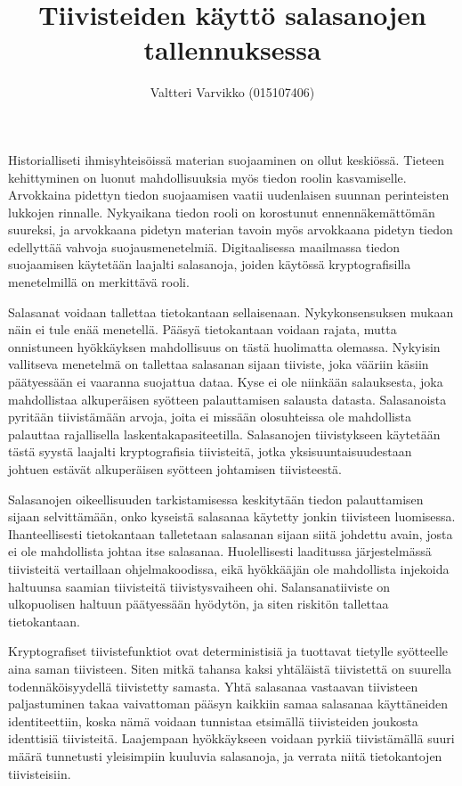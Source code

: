 \documentclass[12pt]{article}
\title{Tiivisteiden käyttö salasanojen tallennuksessa}
\author{Valtteri Varvikko (015107406)}
\begin{document}
\maketitle

Historialliseti ihmisyhteisöissä materian suojaaminen on ollut keskiössä. Tieteen kehittyminen on luonut mahdollisuuksia myös tiedon roolin kasvamiselle. Arvokkaina pidettyn tiedon suojaamisen vaatii uudenlaisen suunnan perinteisten lukkojen rinnalle. Nykyaikana tiedon rooli on korostunut ennennäkemättömän suureksi, ja arvokkaana pidetyn materian tavoin myös arvokkaana pidetyn tiedon edellyttää vahvoja suojausmenetelmiä. Digitaalisessa maailmassa tiedon suojaamisen käytetään laajalti salasanoja, joiden käytössä kryptografisilla menetelmillä on merkittävä rooli.

Salasanat voidaan tallettaa tietokantaan sellaisenaan. Nykykonsensuksen mukaan näin ei tule enää menetellä. Pääsyä tietokantaan voidaan rajata, mutta onnistuneen hyökkäyksen mahdollisuus on tästä huolimatta olemassa. Nykyisin vallitseva menetelmä on tallettaa salasanan sijaan tiiviste, joka vääriin käsiin päätyessään ei vaaranna suojattua dataa. Kyse ei ole niinkään salauksesta, joka mahdollistaa alkuperäisen syötteen palauttamisen salausta datasta. Salasanoista pyritään tiivistämään arvoja, joita ei missään olosuhteissa ole mahdollista palauttaa rajallisella laskentakapasiteetilla. Salasanojen tiivistykseen käytetään tästä syystä laajalti kryptografisia tiivisteitä, jotka yksisuuntaisuudestaan johtuen estävät alkuperäisen syötteen johtamisen tiivisteestä.

Salasanojen oikeellisuuden tarkistamisessa keskitytään tiedon palauttamisen sijaan selvittämään, onko kyseistä salasanaa käytetty jonkin tiivisteen luomisessa. Ihanteellisesti tietokantaan talletetaan salasanan sijaan siitä johdettu avain, josta ei ole mahdollista johtaa itse salasanaa. Huolellisesti laaditussa järjestelmässä tiivisteitä vertaillaan ohjelmakoodissa, eikä hyökkääjän ole mahdollista injekoida haltuunsa saamian tiivisteitä tiivistysvaiheen ohi. Salansanatiiviste on ulkopuolisen haltuun päätyessään hyödytön, ja siten riskitön tallettaa tietokantaan. 

Kryptografiset tiivistefunktiot ovat deterministisiä ja tuottavat tietylle syötteelle aina saman tiivisteen. Siten mitkä tahansa kaksi yhtäläistä tiivistettä on suurella todennäköisyydellä tiivistetty samasta. Yhtä salasanaa vastaavan tiivisteen paljastuminen takaa vaivattoman pääsyn kaikkiin samaa salasanaa käyttäneiden identiteettiin, koska nämä voidaan tunnistaa etsimällä tiivisteiden joukosta identtisiä tiivisteitä. Laajempaan hyökkäykseen voidaan pyrkiä tiivistämällä suuri määrä tunnetusti yleisimpiin kuuluvia salasanoja, ja verrata niitä tietokantojen tiivisteisiin.
\end{document}
